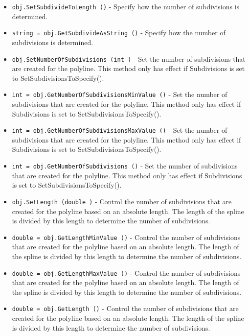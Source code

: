 \begin{itemize}
\item  \verb|obj.SetSubdivideToLength ()| -  Specify how the number of subdivisions is determined.

\item  \verb|string = obj.GetSubdivideAsString ()| -  Specify how the number of subdivisions is determined.

\item  \verb|obj.SetNumberOfSubdivisions (int )| -  Set the number of subdivisions that are created for the
 polyline. This method only has effect if Subdivisions is set
 to SetSubdivisionsToSpecify().

\item  \verb|int = obj.GetNumberOfSubdivisionsMinValue ()| -  Set the number of subdivisions that are created for the
 polyline. This method only has effect if Subdivisions is set
 to SetSubdivisionsToSpecify().

\item  \verb|int = obj.GetNumberOfSubdivisionsMaxValue ()| -  Set the number of subdivisions that are created for the
 polyline. This method only has effect if Subdivisions is set
 to SetSubdivisionsToSpecify().

\item  \verb|int = obj.GetNumberOfSubdivisions ()| -  Set the number of subdivisions that are created for the
 polyline. This method only has effect if Subdivisions is set
 to SetSubdivisionsToSpecify().

\item  \verb|obj.SetLength (double )| -  Control the number of subdivisions that are created for the
 polyline based on an absolute length. The length of the spline
 is divided by this length to determine the number of subdivisions.

\item  \verb|double = obj.GetLengthMinValue ()| -  Control the number of subdivisions that are created for the
 polyline based on an absolute length. The length of the spline
 is divided by this length to determine the number of subdivisions.

\item  \verb|double = obj.GetLengthMaxValue ()| -  Control the number of subdivisions that are created for the
 polyline based on an absolute length. The length of the spline
 is divided by this length to determine the number of subdivisions.

\item  \verb|double = obj.GetLength ()| -  Control the number of subdivisions that are created for the
 polyline based on an absolute length. The length of the spline
 is divided by this length to determine the number of subdivisions.


\end{itemize}
